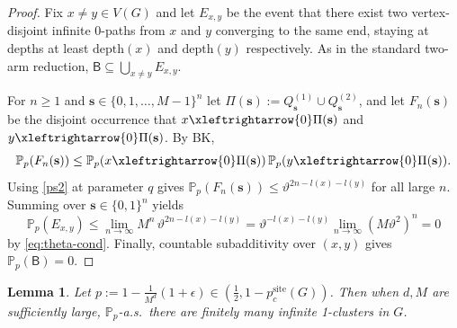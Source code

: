 \documentclass[11pt]{amsart}
\theoremstyle{plain}
\newtheorem{lemma}[theorem]{Lemma}
\numberwithin{equation}{section}
\numberwithin{figure}{section}
\newcommand\PP{{\mathbb P}}
\newcommand\pcs{{p_c^{\mathrm{site}}}}
\renewcommand\ell{l}
\begin{document}
\begin{proof}
Fix $x\neq y\in V(G)$ and let $E_{x,y}$ be the event that there exist two vertex-disjoint
infinite $0$-paths from $x$ and $y$ converging to the same end, staying at depths at least
$\mathrm{depth}(x)$ and $\mathrm{depth}(y)$ respectively. As in the standard two-arm reduction,
$\mathsf{B}\subseteq\bigcup_{x\neq y}E_{x,y}$.

For $n\ge1$ and $\mathbf s\in\{0,1,\ldots,M-1\}^n$ let $\Pi(\mathbf s):=Q_{\mathbf s}^{(1)}\cup Q_{\mathbf s}^{(2)}$,
and let $F_n(\mathbf s)$ be the disjoint occurrence that $x\xleftrightarrow{0}\Pi(\mathbf s)$ and
$y\xleftrightarrow{0}\Pi(\mathbf s)$. By BK,
\[
\PP_p(F_n(\mathbf s))
\le \PP_p(x\xleftrightarrow{0}\Pi(\mathbf s))\,\PP_p(y\xleftrightarrow{0}\Pi(\mathbf s)).
\]
Using \eqref{ps2} at parameter $q$ gives $\PP_p(F_n(\mathbf s))\le \vartheta^{2n-\ell(x)-\ell(y)}$
for all large $n$. Summing over $\mathbf s\in\{0,1\}^n$ yields
\[
\PP_p(E_{x,y})
\le \lim_{n\to\infty}M^n\,\vartheta^{2n-\ell(x)-\ell(y)}
=\vartheta^{-\ell(x)-\ell(y)}\lim_{n\to\infty}(M\vartheta^2)^n
=0
\]
by \eqref{eq:theta-cond}. Finally, countable subadditivity over $(x,y)$ gives $\PP_p(\mathsf{B})=0$.
\end{proof}










\begin{lemma}\label{le711}
Let $p:=1-\frac{1}{M^d}(1+\epsilon)\in (\frac{1}{2},1-\pcs(G))$. Then when $d,M$ are sufficiently large, $\PP_p$-a.s.~there are finitely many infinite 1-clusters in $G$.
\end{lemma}
\end{document}
